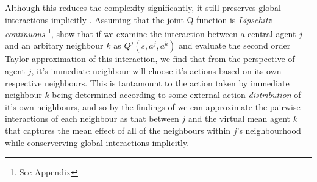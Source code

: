 Although this reduces the complexity significantly, it still preserves global interactions implicitly
\cite{Blume1993}. Assuming that the joint Q function is \emph{Lipschitz continuous} \footnote{See Appendix}, \cite{Yang2018}
show that if we examine the interaction between a central agent $j$ and an arbitary neighbour $k$ as $Q^j(s,a^j,a^k)$
and evaluate the second order Taylor approximation of this interaction, we find that from
the perspective of agent $j$, it's immediate neighbour will choose it's actions based on its
own respective neighbours. This is tantamount to the action taken by immediate neighbour $k$ being determined
according to some external action \emph{distribution} of it's own neighbours, and so by the findings of \cite{Blume1993}
we can approximate the pairwise interactions of each neighbour as that between $j$
and the virtual mean agent $k$ that captures the mean effect of all of the neighbours within $j$'s neighbourhood
while conserverving global interactions implicitly.\\


